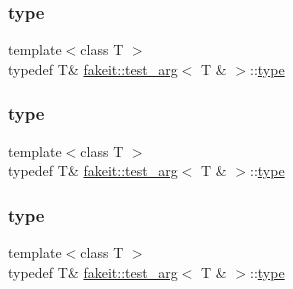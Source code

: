 \subsubsection{\texorpdfstring{type}{type}\hspace{0.1cm}{\footnotesize\ttfamily [4/9]}}
{\footnotesize\ttfamily template$<$class T $>$ \\
typedef T\& \mbox{\hyperlink{structfakeit_1_1test__arg}{fakeit\+::test\+\_\+arg}}$<$ T \& $>$\+::\mbox{\hyperlink{structfakeit_1_1test__arg_3_01T_01_6_01_4_a76c42a4147d9060cc475b5496393cec4}{type}}}

\mbox{\label{structfakeit_1_1test__arg_3_01T_01_6_01_4_a76c42a4147d9060cc475b5496393cec4}} 
\subsubsection{\texorpdfstring{type}{type}\hspace{0.1cm}{\footnotesize\ttfamily [5/9]}}
{\footnotesize\ttfamily template$<$class T $>$ \\
typedef T\& \mbox{\hyperlink{structfakeit_1_1test__arg}{fakeit\+::test\+\_\+arg}}$<$ T \& $>$\+::\mbox{\hyperlink{structfakeit_1_1test__arg_3_01T_01_6_01_4_a76c42a4147d9060cc475b5496393cec4}{type}}}

\mbox{\label{structfakeit_1_1test__arg_3_01T_01_6_01_4_a76c42a4147d9060cc475b5496393cec4}} 
\subsubsection{\texorpdfstring{type}{type}\hspace{0.1cm}{\footnotesize\ttfamily [6/9]}}
{\footnotesize\ttfamily template$<$class T $>$ \\
typedef T\& \mbox{\hyperlink{structfakeit_1_1test__arg}{fakeit\+::test\+\_\+arg}}$<$ T \& $>$\+::\mbox{\hyperlink{structfakeit_1_1test__arg_3_01T_01_6_01_4_a76c42a4147d9060cc475b5496393cec4}{type}}}

\mbox{\label{structfakeit_1_1test__arg_3_01T_01_6_01_4_a76c42a4147d9060cc475b5496393cec4}} 
